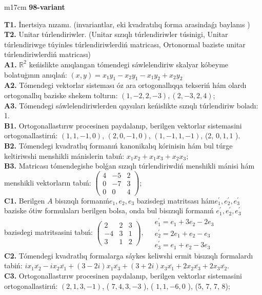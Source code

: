 \documentclass{article}
\begin{document}
\begin{tabular}{m{17cm}}
\textbf{98-variant}
\newline

\textbf{T1.} İnertsiya nızamı. (invariantlar,  eki kvadratılıq forma arasindaǵı baylanıs ) \\
\textbf{T2.} Unitar túrlendiriwler. (Unitar sızıqlı túrlendiriwler túsinigi,  Unitar túrlendiriwge túyinles túrlendiriwlerdiń matricası,   Ortonormal baziste unitar túrlendiriwlerdiń matricası) \\
\textbf{A1.} \(\mathbb{R}^{2}\) keńislikte anıqlangan tómendegi sáwlelendiriw skalyar kóbeyme bolatuģının anıqlań: \((x,y) = x_{1}y_{1} - x_{2}y_{1} - x_{1}y_{2} + x_{2}y_{2}\) \\
\textbf{A2.} Tómendegi vektorlar sisteması óz ara ortogonallıqqa tekseriń hám olardı ortogonallıq baziske shekem toltırın: \((1, - 2,2, - 3),(2, - 3,2,4)\); \\
\textbf{A3.} Tómendegi sáwlelendiriwlerden qaysıları keńislikte sızıqlı túrlendiriw boladı: 1. \\
\textbf{B1.} Ortogonallastırıw procesinen paydalanıp, berilgen vektorlar sistemasini ortogonallastirıń: \((1,1, - 1,0)\), \((2,0, - 1,0)\), \((1, - 1,1, - 1)\), (2, \(0,1,1\) ). \\
\textbf{B2.} Tómendegi kvadratlıq formanıń kanonikalıq kórinisin hám bul túrge keltiriwshi menshikli mánislerin tabıń: \(x_{1}x_{2} + x_{1}x_{3} + x_{2}x_{3}\); \\
\textbf{B3.} Matricası tómendegishe bolǵan sızıqlı túrlendiriwdiń menshikli mánisi hám menshikli vektorların tabıń: \(\begin{pmatrix} 4 & - 5 & 2 \\ 0 & - 7 & 3 \\ 0 & 0 & 4 \end{pmatrix}\); \\
\textbf{C1.} Berilgen \(A\) bisızıqlı formanıń\(e_{1},e_{2},e_{3}\) bazisdegi matritsası hám\(e_{1}^{'},e_{2}^{'},e_{3}^{'}\) baziske ótiw formulaları berilgen bolsa, onda bul bisızıqli formanıń \(e_{1}^{'},e_{2}^{'},e_{3}^{'}\) bazisdegi matritsasini tabıń: \(\begin{pmatrix} 2 & 2 & 3 \\  - 4 & 3 & 1 \\ 3 & 1 & 2 \end{pmatrix},\ \begin{matrix}  & e_{1}^{'} = e_{1} + 3e_{2} - 2e_{3} \\  & e_{2}^{'} = 2e_{1} + e_{2} - e_{3} \\  & e_{3}^{'} = e_{1} + e_{2} - 3e_{3} \end{matrix}\) \\
\textbf{C2.} Tómendegi kvadratlıq formalarga sáykes keliwshi ermit bisızıqlı formalardı tabiń: \(ix_{1}\overline{x_{2}} - ix_{2}\overline{x_{1}} + (3 - 2i)x_{1}\overline{x_{3}} + (3 + 2i)x_{3}\overline{x_{1}} + 2x_{2}\overline{x_{3}} + 2x_{3}\overline{x_{2}}\). \\
\textbf{C3.} Ortogonallastırıw procesinen paydalanıp, berilgen vektorlar sistemasini ortogonallastirıń: \((2,1,3, - 1)\), ( \(7,4,3, - 3\) ), ( \(1,1, - 6,0\) ), (5, 7, 7, 8); \\

\end{tabular}
\end{document}
